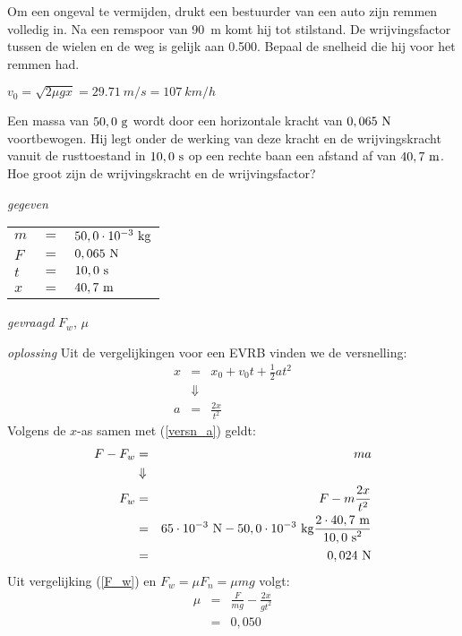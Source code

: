 \begin{exercise} Om een ongeval te vermijden, drukt een bestuurder van een auto zijn remmen volledig in. Na een remspoor van \SI{90}{m} komt hij tot stilstand. De wrijvingsfactor tussen de wielen en de weg is gelijk aan \SI{0,500}{}. Bepaal de snelheid die hij voor het remmen had.

\begin{oplossing}
$v_0=\sqrt{2\mu gx}=\SI{29,71}{m/s}=\SI{107}{km/h}$
\end{oplossing}

\end{exercise}

\begin{exercise} Een massa van $50,0~\rm g$ wordt door een horizontale kracht van $0,065~\rm N$ voortbewogen. Hij legt
onder de werking van deze kracht en de wrij\-vings\-kracht vanuit de rusttoestand in $10,0~\rm s$ op een rechte baan een afstand af van $40,7~\rm m$. Hoe groot zijn de wrijvingskracht en de wrijvingsfactor?
\begin{oplossing}
\item [\textit{gegeven}]
\begin{tabular}[t]{lcl}
$m$ &$=$& $50,0\cdot10^{-3}~\rm kg$\\
$F$ &$=$& $0,065~\rm N$\\
$t$ &$=$& $10,0~\rm s$\\
$x$ &$=$& $40,7~\rm m$\\
\end{tabular}
\item [\textit{gevraagd}]
$F_w$, $\mu$
\item [\textit{oplossing}]
Uit de vergelijkingen voor een EVRB vinden we de versnelling:
\begin{eqnarray}
x &=& x_0+v_0t+\frac{1}{2}at^2\nonumber\\
&\Downarrow& \nonumber\\
a &=&\frac{2x}{t^2}\label{versn_a}
\end{eqnarray}
Volgens de $x$-as samen met (\ref{versn_a}) geldt:
\begin{eqnarray}
F-F_w&=&ma\nonumber\\
&\Downarrow& \nonumber\\
F_w &=& F-m\frac{2x}{t^2}\label{F_w}\\
&=& 65\cdot10^{-3}~{\rm N}-50,0\cdot10^{-3}~{\rm kg}\frac{2\cdot40,7~{\rm m}}{{10,0~{\rm s}}^2}\nonumber\\
&=& 0,024~\rm N\nonumber
\end{eqnarray}
Uit vergelijking (\ref{F_w}) en $F_w=\mu F_n=\mu mg$ volgt:
\begin{eqnarray*}
\mu &=& \frac{F}{mg}-\frac{2x}{gt^2}\\
&=& 0,050
\end{eqnarray*}
\end{oplossing}

\end{exercise}

